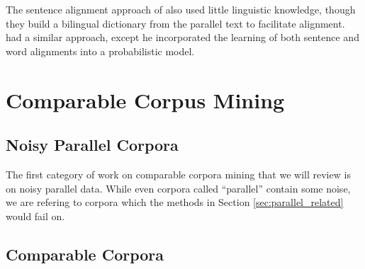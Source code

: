 The sentence alignment approach of \citet{Kay93} also used little linguistic
knowledge, though they build a bilingual dictionary from the parallel text to
facilitate alignment. \citet{Chen93} had a similar approach, except he
incorporated the learning of both sentence and word alignments into a
probabilistic model.

\section{Comparable Corpus Mining}
\label{sec:comparable_related}

\subsection{Noisy Parallel Corpora}
\label{sec:noisy_related}
The first category of work on comparable corpora mining that we will review is
on noisy parallel data. While even corpora called ``parallel'' contain some
noise, we are refering to corpora which the methods in Section
\ref{sec:parallel_related} would fail on.

\subsection{Comparable Corpora}
\label{sec:nonnoisy_related}
